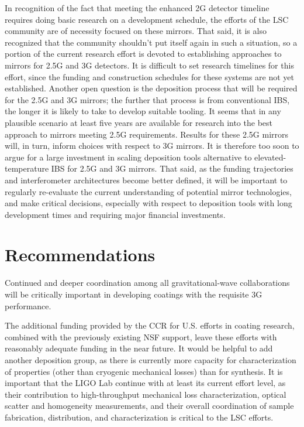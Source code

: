 In recognition of the fact that meeting the enhanced 2G detector timeline requires doing basic research on a development schedule, the efforts of the LSC community are of necessity focused on these mirrors. That said, it is also recognized that the community shouldn't put itself again in such a situation, so a portion of the current research effort is devoted to establishing approaches to mirrors for 2.5G and 3G detectors. It is difficult to set research timelines for this effort, since the funding and construction schedules for these systems are not yet established. Another open question is the deposition process that will be required for the 2.5G and 3G mirrors; the further that process is from conventional IBS, the longer it is likely to take to develop suitable tooling. It seems that in any plausible scenario at least five years are available for research into the best approach to mirrors meeting 2.5G requirements. Results for these 2.5G mirrors will, in turn, inform choices with respect to 3G mirrors. It is therefore too soon to argue for a large investment in scaling deposition tools alternative to elevated-temperature IBS for 2.5G and 3G mirrors. That said, as the funding trajectories and interferometer architectures become better defined, it will be important to regularly re-evaluate the current understanding of potential mirror technologies, and make critical decisions, especially with respect to deposition tools with long development times and requiring major financial investments.

\section{Recommendations}
\label{coatings_Recomm}

Continued and deeper coordination among all gravitational-wave collaborations will be critically important in developing coatings with the requisite 3G performance.

The additional funding provided by the CCR for U.S. efforts in coating research, combined with the previously existing NSF support, leave these efforts with reasonably adequate funding in the near future. It would be helpful to add another deposition group, as there is currently more capacity for characterization of properties (other than cryogenic mechanical losses) than for synthesis. It is important that the LIGO Lab continue with at least its current effort level, as their contribution to high-throughput mechanical loss characterization, optical scatter and homogeneity measurements, and their overall coordination of sample fabrication, distribution, and characterization is critical to the LSC efforts.


